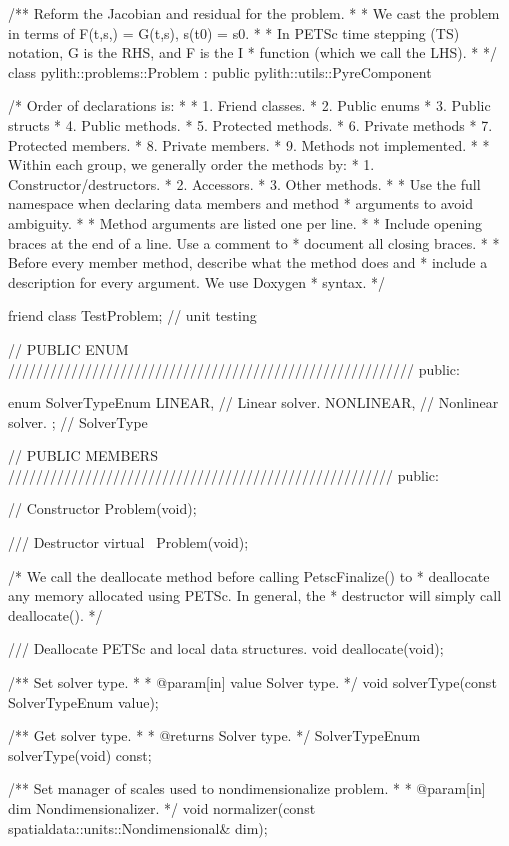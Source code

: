 \begin{cplusplus}
/** Reform the Jacobian and residual for the problem.
 *
 * We cast the problem in terms of F(t,s,) = G(t,s), s(t0) = s0.
 *
 * In PETSc time stepping (TS) notation, G is the RHS, and F is the I
 * function (which we call the LHS).
 *
 */
class pylith::problems::Problem : public pylith::utils::PyreComponent {
  /* Order of declarations is:
  *
  * 1. Friend classes.
  * 2. Public enums
  * 3. Public structs
  * 4. Public methods.
  * 5. Protected methods.
  * 6. Private methods
  * 7. Protected members.
  * 8. Private members.
  * 9. Methods not implemented.
  *
  * Within each group, we generally order the methods by:
  * 1. Constructor/destructors.
  * 2. Accessors.
  * 3. Other methods.
  *
  * Use the full namespace when declaring data members and method
  * arguments to avoid ambiguity.
  *
  * Method arguments are listed one per line.
  *
  * Include opening braces at the end of a line. Use a comment to
  * document all closing braces.
  *
  * Before every member method, describe what the method does and
  * include a description for every argument. We use Doxygen
  * syntax.
  */

  friend class TestProblem;   // unit testing

    // PUBLIC ENUM //////////////////////////////////////////////////////////
public:

    enum SolverTypeEnum {
        LINEAR, // Linear solver.
        NONLINEAR, // Nonlinear solver.
    };   // SolverType


    // PUBLIC MEMBERS ///////////////////////////////////////////////////////
public:

    // Constructor
    Problem(void);

    /// Destructor
    virtual ~Problem(void);

    /* We call the deallocate method before calling PetscFinalize() to
     * deallocate any memory allocated using PETSc. In general, the
     * destructor will simply call deallocate().
     */
    
    /// Deallocate PETSc and local data structures.
    void deallocate(void);

    /** Set solver type.
     *
     * @param[in] value Solver type.
     */
    void solverType(const SolverTypeEnum value);

    /** Get solver type.
     *
     * @returns Solver type.
     */
    SolverTypeEnum solverType(void) const;

    /** Set manager of scales used to nondimensionalize problem.
     *
     * @param[in] dim Nondimensionalizer.
     */
    void normalizer(const spatialdata::units::Nondimensional& dim);

}
\end{cplusplus}
